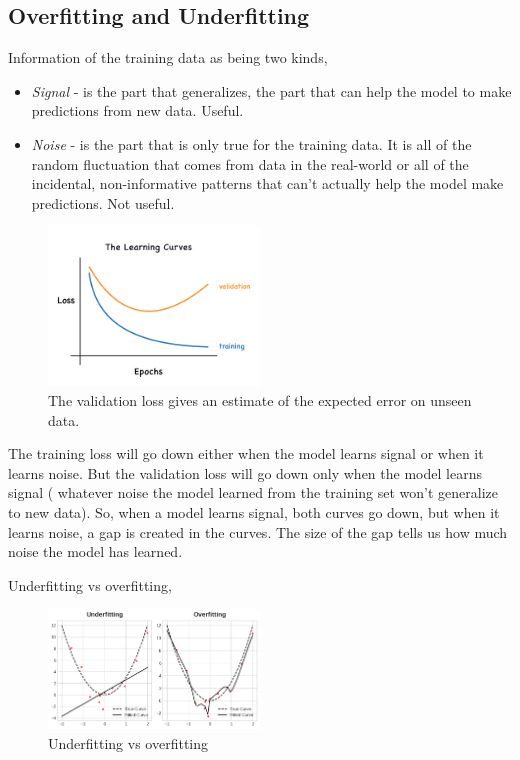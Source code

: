 \subsection{Overfitting and Underfitting}
Information of the training data as being two kinds,
\begin{itemize}
	\item \emph{Signal} - is the part that generalizes, the part that can help
		the model to make predictions from new data. Useful.
	\item \emph{Noise} - is the part that is only true for the training data. It
		is all of the random fluctuation that comes from data in the real-world
		or all of the incidental, non-informative patterns that can't actually
		help the model make predictions. Not useful.
\end{itemize}

\begin{figure}[htp]
	\centering
	\includegraphics[width=0.5\textwidth]{../assets/machine_learning_random/signal_vs_noise.png}
	\caption{The validation loss gives an estimate of the expected error on unseen data.}
\end{figure}

\noindent The training loss will go down either when the model learns signal or when it
learns noise. But the validation loss will go down only when the model learns signal (
whatever noise the model learned from the training set won't generalize to new data). So,
when a model learns signal, both curves go down, but when it learns noise, a gap is created
in the curves. The size of the gap tells us how much noise the model has learned.

\noindent Underfitting vs overfitting,

\begin{figure}[htp]
	\centering
	\includegraphics[width=0.5\textwidth]{../assets/machine_learning_random/underfitting_vs_overfitting.png}
	\caption{Underfitting vs overfitting}
\end{figure}

